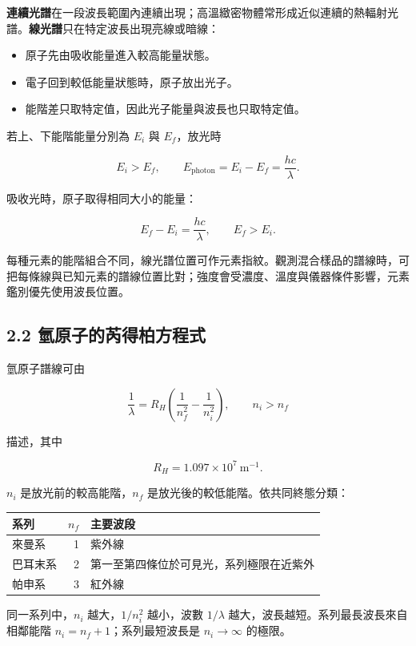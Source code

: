 \documentclass[11pt,a4paper]{article}
\newcounter{none}
\providecommand{\tightlist}{%
  \setlength{\itemsep}{0pt}\setlength{\parskip}{0pt}}
\begin{document}
\textbf{連續光譜}在一段波長範圍內連續出現；高溫緻密物體常形成近似連續的熱輻射光譜。\textbf{線光譜}只在特定波長出現亮線或暗線：

\begin{itemize}
\tightlist
\item
  原子先由吸收能量進入較高能量狀態。
\item
  電子回到較低能量狀態時，原子放出光子。
\item
  能階差只取特定值，因此光子能量與波長也只取特定值。
\end{itemize}

若上、下能階能量分別為 \(E_i\) 與 \(E_f\)，放光時

\[
E_i>E_f,\qquad
E_{\mathrm{photon}}=E_i-E_f=\frac{hc}{\lambda}.
\]

吸收光時，原子取得相同大小的能量：

\[
E_f-E_i=\frac{hc}{\lambda},\qquad E_f>E_i.
\]

每種元素的能階組合不同，線光譜位置可作元素指紋。觀測混合樣品的譜線時，可把每條線與已知元素的譜線位置比對；強度會受濃度、溫度與儀器條件影響，元素鑑別優先使用波長位置。

\subsection{2.2 氫原子的芮得柏方程式}\label{ux6c2bux539fux5b50ux7684ux82aeux5f97ux67cfux65b9ux7a0bux5f0f}

氫原子譜線可由

\[
\frac1\lambda
=R_H\left(\frac1{n_f^2}-\frac1{n_i^2}\right),
\qquad n_i>n_f
\]

描述，其中

\[
R_H=1.097\times10^7\ \mathrm{m^{-1}}.
\]

\(n_i\) 是放光前的較高能階，\(n_f\) 是放光後的較低能階。依共同終態分類：

{\def\LTcaptype{none} %
\begin{longtable}[]{@{}lrl@{}}
\toprule\noalign{}
系列 & \(n_f\) & 主要波段 \\
\midrule\noalign{}
\endhead
\bottomrule\noalign{}
\endlastfoot
來曼系 & 1 & 紫外線 \\
巴耳末系 & 2 & 第一至第四條位於可見光，系列極限在近紫外 \\
帕申系 & 3 & 紅外線 \\
\end{longtable}
}

同一系列中，\(n_i\) 越大，\(1/n_i^2\) 越小，波數 \(1/\lambda\) 越大，波長越短。系列最長波長來自相鄰能階 \(n_i=n_f+1\)；系列最短波長是 \(n_i\to\infty\) 的極限。
\end{document}
